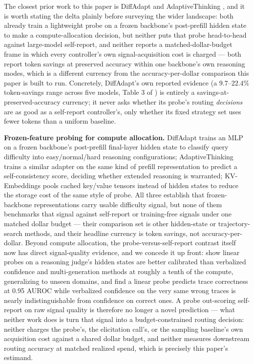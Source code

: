 \documentclass[11pt]{article}
\begin{document}
The closest prior work to this paper is DiffAdapt \citep{DiffAdapt644F} and AdaptiveThinking \citep{AdaptiveThink2i6}, and it is worth stating the delta plainly before surveying the wider landscape: both already train a lightweight probe on a frozen backbone's post-prefill hidden state to make a compute-allocation decision, but neither puts that probe head-to-head against large-model self-report, and neither reports a matched-dollar-budget frame in which every controller's own signal-acquisition cost is charged --- both report token savings at preserved accuracy within one backbone's own reasoning modes, which is a different currency from the accuracy-per-dollar comparison this paper is built to run. Concretely, DiffAdapt's own reported evidence (a $9.7$--$22.4\%$ token-savings range across five models, Table 3 of \citealp{DiffAdapt644F}) is entirely a savings-at-preserved-accuracy currency; it never asks whether its probe's routing \emph{decisions} are as good as a self-report controller's, only whether its fixed strategy set uses fewer tokens than a uniform baseline.

\textbf{Frozen-feature probing for compute allocation.} DiffAdapt \citep{DiffAdapt644F} trains an MLP on a frozen backbone's post-prefill final-layer hidden state to classify query difficulty into easy/normal/hard reasoning configurations; AdaptiveThinking \citep{AdaptiveThink2i6} trains a similar adapter on the same kind of prefill representation to predict a self-consistency score, deciding whether extended reasoning is warranted; KV-Embeddings \citep{KVEmbedGUhm} pools cached key/value tensors instead of hidden states to reduce the storage cost of the same style of probe. All three establish that frozen-backbone representations carry usable difficulty signal, but none of them benchmarks that signal against self-report or training-free signals under one matched dollar budget --- their comparison set is other hidden-state or trajectory-search methods, and their headline currency is token savings, not accuracy-per-dollar. Beyond compute allocation, the probe-versus-self-report contrast itself now has direct signal-quality evidence, and we concede it up front: \citet{LinearJudgeProbes2512} show linear probes on a reasoning judge's hidden states are better calibrated than verbalized confidence and multi-generation methods at roughly a tenth of the compute, generalizing to unseen domains, and \citet{HiddenError2605} find a linear probe predicts trace correctness at 0.95 AUROC while verbalized confidence on the very same wrong traces is nearly indistinguishable from confidence on correct ones. A probe out-scoring self-report on raw signal quality is therefore no longer a novel prediction --- what neither work does is turn that signal into a budget-constrained routing decision: neither charges the probe's, the elicitation call's, or the sampling baseline's own acquisition cost against a shared dollar budget, and neither measures downstream routing accuracy at matched realized spend, which is precisely this paper's estimand.
\end{document}
